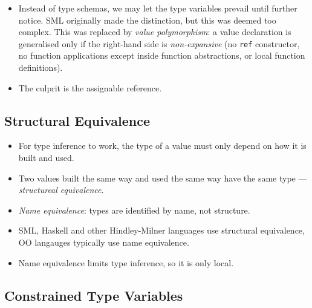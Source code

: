 \begin{itemize}
\begin{itemize}
\item Instead of type schemas, we may let the type variables prevail until
further notice. SML originally made the distinction, but this was deemed too
complex. This was replaced by \emph{value polymorphism}: a value declaration is
generalised only if the right-hand side is \emph{non-expansive} (no
\texttt{ref} constructor, no function applications except inside function
abstractions, or local function definitions).

\item The culprit is the assignable reference.

\end{itemize}

\end{itemize}

\subsection{Structural Equivalence}

\begin{itemize}

\item For type inference to work, the type of a value must only depend on how
it is built and used.

\item Two values built the same way and used the same way have the same type
--- \emph{structureal equivalence}.

\item \emph{Name equivalence}: types are identified by name, not structure.

\item SML, Haskell and other Hindley-Milner languages use structural
equivalence, OO langauges typically use name equivalence.

\item Name equivalence limits type inference, so it is only local.

\end{itemize}

\subsection{Constrained Type Variables}

